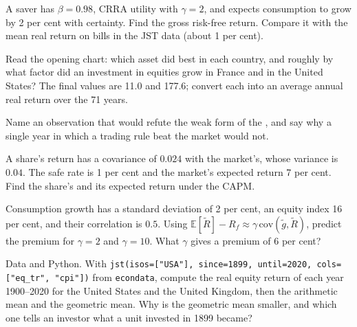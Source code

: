 \begin{exercise}[$\star$]\label{exo:b2:asset-prices:2}
A saver has $\beta = 0.98$, CRRA utility with $\gamma = 2$, and expects consumption to grow by 2 per
cent with certainty. Find the gross risk-free return. Compare it with the mean real return on bills in
the JST data (about 1 per cent).
\end{exercise}

\begin{exercise}[$\star$]\label{exo:b2:asset-prices:3}
Read the opening chart: which asset did best in each country, and roughly by what factor did an
investment in equities grow in France and in the United States? The final values are 11.0 and 177.6;
convert each into an average annual real return over the 71 years.
\end{exercise}

\begin{exercise}[$\star$]\label{exo:b2:asset-prices:4}
Name an observation that would refute the weak form of the , and say why
a single year in which a trading rule beat the market would not.
\end{exercise}

\begin{exercise}[$\star\star$]\label{exo:b2:asset-prices:5}
A share's return has a covariance of $0.024$ with the market's, whose variance is $0.04$. The safe rate
is 1 per cent and the market's expected return 7 per cent. Find the share's  and its expected
return under the CAPM.
\end{exercise}

\begin{exercise}[$\star\star$]\label{exo:b2:asset-prices:6}
Consumption growth has a standard deviation of 2 per cent, an equity index 16 per cent, and their
correlation is $0.5$. Using $\mathbb{E}[\tilde R] - R_f \approx \gamma\,\mathrm{cov}(\tilde g, \tilde R)$,
predict the premium for $\gamma = 2$ and $\gamma = 10$. What $\gamma$ gives a premium of 6 per cent?
\end{exercise}

\begin{exercise}[$\star\star$]\label{exo:b2:asset-prices:7}
Data and Python. With \texttt{jst(isos=["USA"], since=1899, until=2020, cols=["eq\_tr", "cpi"])} from
\texttt{econdata}, compute the real equity return of each year 1900--2020 for the United States and the
United Kingdom, then the arithmetic mean and the geometric mean. Why is the geometric mean smaller, and
which one tells an investor what a unit invested in 1899 became?
\end{exercise}

